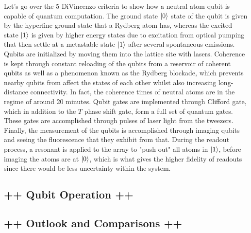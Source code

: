 \documentclass[10pt,letterpaper]{article}
\begin{document}
Let's go over the 5 DiVincenzo criteria to show how a neutral atom qubit is capable of quantum computation. The ground state $\ket{0}$ state of the qubit is given by the hyperfine ground state that a Rydberg atom has, whereas the excited state $\ket{1}$ is given by higher energy states due to excitation from optical pumping that then settle at a metastable state $\ket{1}$ after several spontaneous emissions. Qubits are initialized by moving them into the lattice site with lasers. Coherence is kept through constant reloading of the qubits from a reservoir of coherent qubits as well as a phenomenon known as the Rydberg blockade, which prevents nearby qubits from affect the states of each other whilst also increasing long-distance connectivity. In fact, the coherence times of neutral atoms are in the regime of around 20 minutes. Qubit gates are implemented through Clifford gate, which in addition to the $T$ phase shift gate, form a full set of quantum gates. These gates are accomplished through pulses of laser light from the tweezers. Finally, the measurement of the qubits is accomplished through imaging qubits and seeing the fluorescence that they exhibit from that. During the readout process, a resonant is applied to the array to "push out" all atoms in $\ket{1}$, before imaging the atoms are at $\ket{0}$, which is what gives the higher fidelity of readouts since there would be less uncertainty within the system. 

\subsection*{++ Qubit Operation ++}


\subsection*{++ Outlook and Comparisons ++}
	
\end{document}
